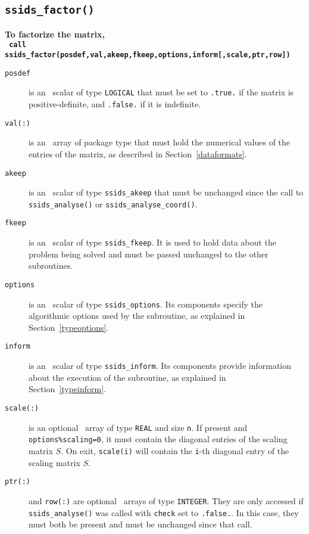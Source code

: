 \subsection{\texttt{ssids\_factor()}} \label{factorize}
\textbf{To factorize the matrix,
   \vspace*{0.1cm} \\
   \texttt{ \hspace*{0.2cm}
      call ssids\_factor(posdef,val,akeep,fkeep,options,inform[,scale,ptr,row])
   }
}

\begin{description}
\item[\texttt{posdef}] is an \intentin\ scalar of type {\tt LOGICAL} that
must be set to {\tt .true.} if the matrix is positive-definite, and
{\tt .false.} if it is indefinite.

\item[\texttt{val(:)}] is an \intentin\ array of package type that must hold
the numerical values of the entries of the matrix, as described in
Section~\ref{dataformats}.

\item[\texttt{akeep}]  is an \intentin\ scalar of type
{\tt ssids\_akeep} that must be unchanged since the
call to {\tt ssids\_analyse()} or {\tt ssids\_analyse\_coord()}.

\item[\texttt{fkeep}]  is an \intentinout\ scalar of type
{\tt ssids\_fkeep}. It is used to hold data about the problem being
solved and must be passed unchanged to the other subroutines.

\item[\texttt{options}] is an \intentin\ scalar of type {\tt ssids\_options}.
Its components specify the algorithmic options used by the subroutine, as
explained in Section~\ref{typeoptions}.

\item[\texttt{inform}] is an \intentout\ scalar of type
{\tt ssids\_inform}. Its components provide information about the execution
of the subroutine, as explained in Section~\ref{typeinform}.

\item[\texttt{scale(:)}] is an optional \intentinout\ array of type {\tt REAL}
and size {\tt n}. If present and \texttt{options\%scaling=0}, it must contain
the diagonal entries of the scaling matrix ${S}$. On exit, \texttt{scale(i)}
will contain the \texttt{i}-th diagonal entry of the scaling matrix $S$.

\item[\texttt{ptr(:)}] and {\tt row(:)} are optional \intentin\ arrays of
type {\tt INTEGER}. They are only accessed if {\tt ssids\_analyse()} was called
with {\tt check} set to {\tt .false.}.
In this case, they must both be present and  must be unchanged since that call.

\end{description}

